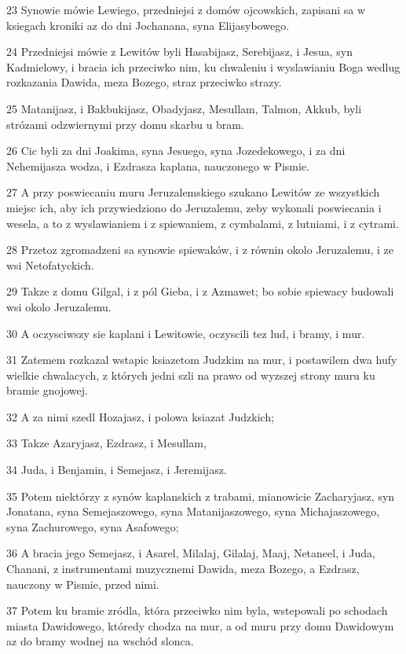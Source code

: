 \par 23 Synowie mówie Lewiego, przedniejsi z domów ojcowskich, zapisani sa w ksiegach kroniki az do dni Jochanana, syna Elijasybowego.
\par 24 Przedniejsi mówie z Lewitów byli Hasabijasz, Serebijasz, i Jesua, syn Kadmielowy, i bracia ich przeciwko nim, ku chwaleniu i wyslawianiu Boga wedlug rozkazania Dawida, meza Bozego, straz przeciwko strazy.
\par 25 Matanijasz, i Bakbukijasz, Obadyjasz, Mesullam, Talmon, Akkub, byli strózami odzwiernymi przy domu skarbu u bram.
\par 26 Cic byli za dni Joakima, syna Jesuego, syna Jozedekowego, i za dni Nehemijasza wodza, i Ezdrasza kaplana, nauczonego w Pismie.
\par 27 A przy poswiecaniu muru Jeruzalemskiego szukano Lewitów ze wszystkich miejsc ich, aby ich przywiedziono do Jeruzalemu, zeby wykonali poswiecania i wesela, a to z wyslawianiem i z spiewaniem, z cymbalami, z lutniami, i z cytrami.
\par 28 Przetoz zgromadzeni sa synowie spiewaków, i z równin okolo Jeruzalemu, i ze wsi Netofatyckich.
\par 29 Takze z domu Gilgal, i z pól Gieba, i z Azmawet; bo sobie spiewacy budowali wsi okolo Jeruzalemu.
\par 30 A oczysciwszy sie kaplani i Lewitowie, oczyscili tez lud, i bramy, i mur.
\par 31 Zatemem rozkazal wstapic ksiazetom Judzkim na mur, i postawilem dwa hufy wielkie chwalacych, z których jedni szli na prawo od wyzszej strony muru ku bramie gnojowej.
\par 32 A za nimi szedl Hozajasz, i polowa ksiazat Judzkich;
\par 33 Takze Azaryjasz, Ezdrasz, i Mesullam,
\par 34 Juda, i Benjamin, i Semejasz, i Jeremijasz.
\par 35 Potem niektórzy z synów kaplanskich z trabami, mianowicie Zacharyjasz, syn Jonatana, syna Semejaszowego, syna Matanijaszowego, syna Michajaszowego, syna Zachurowego, syna Asafowego;
\par 36 A bracia jego Semejasz, i Asarel, Milalaj, Gilalaj, Maaj, Netaneel, i Juda, Chanani, z instrumentami muzycznemi Dawida, meza Bozego, a Ezdrasz, nauczony w Pismie, przed nimi.
\par 37 Potem ku bramie zródla, która przeciwko nim byla, wstepowali po schodach miasta Dawidowego, któredy chodza na mur, a od muru przy domu Dawidowym az do bramy wodnej na wschód slonca.

